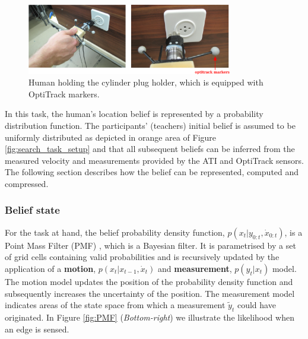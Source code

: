 \documentclass[final,3p,times,twocolumn]{elsarticle}
\begin{document}
\begin{figure}
 \centering
 \includegraphics[width=0.8\textwidth]{./Figures/Fig/plug_socket_closeup.pdf}
 \caption{Human holding the cylinder plug holder, which is equipped with OptiTrack markers.}
 \label{fig:plug_cylinder}
\end{figure}

In this task, the human's location belief is represented by a probability distribution function. 
The participants' (teachers) initial belief is assumed to be uniformly distributed as depicted 
in orange area of Figure \ref{fig:search_task_setup} and that all subsequent beliefs can be inferred from the measured velocity 
and measurements provided by the ATI and OptiTrack sensors. The following section describes how the belief can be represented, 
computed and compressed.

\subsubsection{Belief state}
For the task at hand, the belief probability density function,  $p(x_t|y_{0:t},\dot{x}_{0:t})$,  
is a Point Mass Filter (PMF) \cite[p.87]{Bergman99recursivebayesian}, which is a  Bayesian filter.
It is parametrised by a set of grid cells containing valid probabilities 
and is recursively updated by the application of a \textbf{motion}, $p(x_t|x_{t-1},\dot{x}_t)$ 
and \textbf{measurement}, $p(y_t|x_t)$ model. The motion model updates the position of the probability density function 
and subsequently increases the uncertainty of the position.  The measurement model indicates areas 
of the state space from which a measurement $\tilde{y}_t$ could have originated. 
In Figure \ref{fig:PMF} (\textit{Bottom-right}) we illustrate the likelihood when an edge is sensed.
\end{document}
